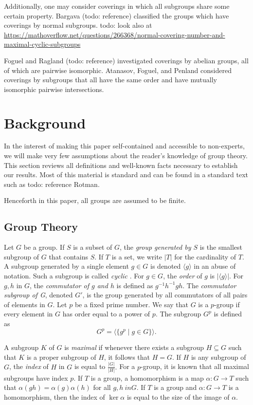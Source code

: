 \documentclass{amsart}
\numberwithin{equation} {section}
\theoremstyle{definition}
\begin{document}
Additionally, one may consider coverings in which all subgroups share some certain property. Bargava (todo: reference) classified the groups which have coverings by normal subgroups. todo: look also at \url{https://mathoverflow.net/questions/266368/normal-covering-number-and-maximal-cyclic-subgroups}

Foguel and Ragland (todo: reference) investigated coverings by abelian groups, all of which are pairwise isomorphic. Atanasov, Foguel, and Penland considered coverings by subgroups that all have the same order and have mutually isomorphic pairwise intersections. 

\section{Background} 

In the interest of making this paper self-contained and accessible to non-experts, we will make very few assumptions about the reader's knowledge of group theory. This section reviews all definitions and well-known facts necessary to establish our results. Most of this material is standard and can be found in a standard text such as todo: reference Rotman.

Henceforth in this paper, all groups are assumed to be finite. 


\subsection{Group Theory}

Let $G$ be a group. If $S$ is a subset of $G$, the \textit{group generated by $S$} is the smallest subgroup of $G$ that contains $S$. If $T$ is a set, we write $|T|$ for the cardinality of $T$. A subgroup generated by a single element $g \in G$ is denoted $\langle g \rangle$ in an abuse of notation. Such a subgroup is called \textit{cyclic} . For $g \in G$, the \textit{order} of $g$ is $|\langle g \rangle|$.  For $g,h$ in $G$, the \textit{commutator of $g$ and $h$} is defined as $g^{-1}h^{-1}gh$. The \textit{commutator subgroup of G}, denoted $G'$, is the group generated by all commutators of all pairs of elements in $G$. Let $p$ be a fixed prime number. We say that $G$ is a $p$-group if every element in $G$ has order equal to a power of $p$. The subgroup $G^p$ is defined as \[
G^p = \langle \{ g^p \mid g \in G \} \rangle.
\]

A subgroup $K$ of $G$ is \textit{maximal} if whenever there exists a subgroup $H \subseteq G$ such that $K$ is a proper subgroup of $H$, it follows that $H = G$. If $H$ is any subgroup of $G$, the \textit{index} of $H$ in $G$ is equal to $\displaystyle\frac{|G|}{|H|}.$ For a $p$-group, it is known that all maximal subgroups have index $p$. If $T$ is a group, a homomorphism is a map $\alpha: G \rightarrow T$ such that $\alpha(gh) = \alpha(g)\alpha(h)$ for all $g, h\ in G$. If $T$ is a group and $\alpha: G \rightarrow T$ is a homomorphism, then the index of $\ker \alpha$ is equal to the size of the image of $\alpha$. 
\end{document}
